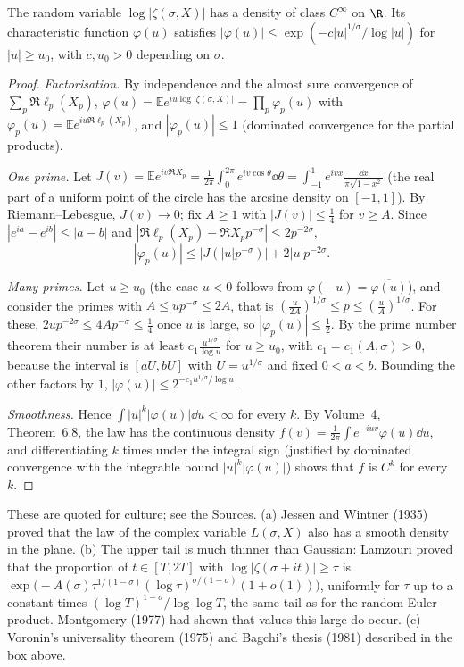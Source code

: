 \begin{theorem}\label{thm:smoothdensity}
The random variable $\log|\zeta(\sigma,X)|$ has a density of class $C^\infty$ on $\R$. Its characteristic function $\varphi(u)$ satisfies $|\varphi(u)|\le\exp(-c|u|^{1/\sigma}/\log|u|)$ for $|u|\ge u_0$, with $c,u_0>0$ depending on $\sigma$.
\end{theorem}
\begin{proof}
\emph{Factorisation.} By independence and the almost sure convergence of $\sum_p\Re\ell_p(X_p)$, $\varphi(u)=\mathbb Ee^{iu\log|\zeta(\sigma,X)|}=\prod_p\varphi_p(u)$ with $\varphi_p(u)=\mathbb Ee^{iu\Re\ell_p(X_p)}$, and $|\varphi_p(u)|\le1$ (dominated convergence for the partial products).

\emph{One prime.} Let $J(v)=\mathbb Ee^{iv\Re X_p}=\frac1{2\pi}\int_0^{2\pi}e^{iv\cos\theta}\dd\theta=\int_{-1}^1e^{ivx}\frac{\dd x}{\pi\sqrt{1-x^2}}$ (the real part of a uniform point of the circle has the arcsine density on $[-1,1]$). By Riemann--Lebesgue, $J(v)\to0$; fix $A\ge1$ with $|J(v)|\le\frac14$ for $v\ge A$. Since $|e^{ia}-e^{ib}|\le|a-b|$ and $|\Re\ell_p(X_p)-\Re X_pp^{-\sigma}|\le2p^{-2\sigma}$,
\[
|\varphi_p(u)|\le|J(|u|p^{-\sigma})|+2|u|p^{-2\sigma}.
\]

\emph{Many primes.} Let $u\ge u_0$ (the case $u<0$ follows from $\varphi(-u)=\overline{\varphi(u)}$), and consider the primes with $A\le up^{-\sigma}\le2A$, that is $(\frac u{2A})^{1/\sigma}\le p\le(\frac uA)^{1/\sigma}$. For these, $2up^{-2\sigma}\le4Ap^{-\sigma}\le\frac14$ once $u$ is large, so $|\varphi_p(u)|\le\frac12$. By the prime number theorem their number is at least $c_1\frac{u^{1/\sigma}}{\log u}$ for $u\ge u_0$, with $c_1=c_1(A,\sigma)>0$, because the interval is $[aU,bU]$ with $U=u^{1/\sigma}$ and fixed $0<a<b$. Bounding the other factors by $1$, $|\varphi(u)|\le2^{-c_1u^{1/\sigma}/\log u}$.

\emph{Smoothness.} Hence $\int|u|^k|\varphi(u)|\dd u<\infty$ for every $k$. By Volume~4, Theorem~6.8, the law has the continuous density $f(v)=\frac1{2\pi}\int e^{-iuv}\varphi(u)\dd u$, and differentiating $k$ times under the integral sign (justified by dominated convergence with the integrable bound $|u|^k|\varphi(u)|$) shows that $f$ is $C^k$ for every $k$.
\end{proof}

\begin{remark}
These are quoted for culture; see the Sources. (a) Jessen and Wintner (1935) proved that the law of the complex variable $L(\sigma,X)$ also has a smooth density in the plane. (b) The upper tail is much thinner than Gaussian: Lamzouri proved that the proportion of $t\in[T,2T]$ with $\log|\zeta(\sigma+it)|\ge\tau$ is $\exp\bigl(-A(\sigma)\tau^{1/(1-\sigma)}(\log\tau)^{\sigma/(1-\sigma)}(1+o(1))\bigr)$, uniformly for $\tau$ up to a constant times $(\log T)^{1-\sigma}/\log\log T$, the same tail as for the random Euler product. Montgomery (1977) had shown that values this large do occur. (c) Voronin's universality theorem (1975) and Bagchi's thesis (1981) described in the box above.
\end{remark}
